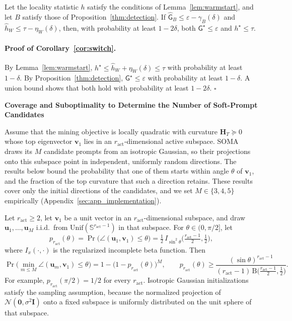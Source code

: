 {\begin{corollary}\label{cor:switch}
Let the locality statistic $h$ satisfy the conditions of Lemma~\ref{lem:warmstart}, and let $B$ satisfy those of Proposition~\ref{thm:detection}. If $\widehat{\mathsf G}_B\le\varepsilon-\gamma_B(\delta)$ and $\hat h_W\le\tau-\eta_W(\delta)$, then, with probability at least $1-2\delta$, both $\mathsf G^\star\le\varepsilon$ and $h^\star\le\tau$.
\end{corollary}

\paragraph{Proof of Corollary~\ref{cor:switch}.}
By Lemma~\ref{lem:warmstart}, $h^\star\le\hat h_W+\eta_W(\delta)\le\tau$ with probability at least $1-\delta$. By Proposition~\ref{thm:detection}, $\mathsf G^\star\le\varepsilon$ with probability at least $1-\delta$. A union bound shows that both hold with probability at least $1-2\delta$.
\hfill$\square$

\bigskip
\textbf{Coverage and Suboptimality to Determine the Number of Soft-Prompt Candidates}

Assume that the mining objective is locally quadratic with curvature $\mathbf H_T\succeq 0$ whose top eigenvector $\boldsymbol v_1$ lies in an $r_{\mathrm{act}}$-dimensional active subspace. SOMA draws its $M$ candidate prompts from an isotropic Gaussian, so their projections onto this subspace point in independent, uniformly random directions. The results below bound the probability that one of them starts within angle $\theta$ of $\boldsymbol v_1$, and the fraction of the top curvature that such a direction retains. These results cover only the initial directions of the candidates, and we set $M\in\{3,4,5\}$ empirically (Appendix~\ref{sec:app_implementation}).

\begin{proposition}\label{thm:coverage}
Let $r_{\mathrm{act}}\ge 2$, let $\boldsymbol v_1$ be a unit vector in an $r_{\mathrm{act}}$-dimensional subspace, and draw $\boldsymbol u_1,\ldots,\boldsymbol u_M$ i.i.d.\ from $\mathrm{Unif}(\mathbb S^{r_{\mathrm{act}}-1})$ in that subspace. For $\theta\in(0,\pi/2]$, let
\[
p_{r_{\mathrm{act}}}(\theta)=\Pr\big(\angle(\boldsymbol u_1,\boldsymbol v_1)\le\theta\big)=\tfrac12\,I_{\sin^2\theta}\Big(\tfrac{r_{\mathrm{act}}-1}{2},\tfrac12\Big),
\]
where $I_x(\cdot,\cdot)$ is the regularized incomplete beta function. Then
\[
\Pr\Big(\min_{m\le M}\angle(\boldsymbol u_m,\boldsymbol v_1)\le\theta\Big)=1-\big(1-p_{r_{\mathrm{act}}}(\theta)\big)^M,
\qquad
p_{r_{\mathrm{act}}}(\theta)\ge\frac{(\sin\theta)^{r_{\mathrm{act}}-1}}{(r_{\mathrm{act}}-1)\,\mathrm B\big(\frac{r_{\mathrm{act}}-1}{2},\frac12\big)} .
\]
For example, $p_{r_{\mathrm{act}}}(\pi/2)=1/2$ for every $r_{\mathrm{act}}$. Isotropic Gaussian initializations satisfy the sampling assumption, because the normalized projection of $\mathcal N(\boldsymbol 0,\sigma^2\mathbf I)$ onto a fixed subspace is uniformly distributed on the unit sphere of that subspace.
\end{proposition}

}
